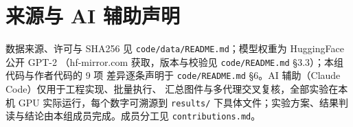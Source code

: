 \documentclass[11pt,a4paper]{ctexart}
\begin{document}
\appendix
\section{来源与 AI 辅助声明}
数据来源、许可与 SHA256 见 \texttt{code/data/README.md}；模型权重为 HuggingFace 公开 GPT-2
（hf-mirror.com 获取，版本与校验见 \texttt{code/README.md} \S3.3）；本组代码与作者代码的 9 项
差异逐条声明于 \texttt{code/README.md} \S6。AI 辅助（Claude Code）仅用于工程实现、批量执行、
汇总图件与多代理交叉复核，全部实验在本机 GPU 实际运行，每个数字可溯源到 \texttt{results/}
下具体文件；实验方案、结果判读与结论由本组成员完成。成员分工见 \texttt{contributions.md}。
\end{document}
